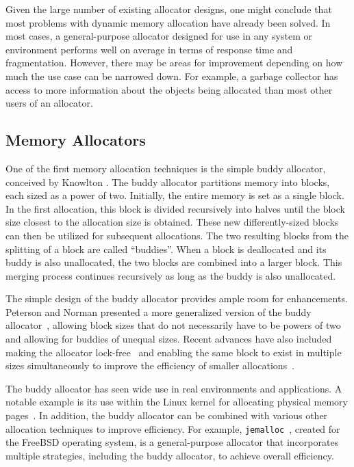 Given the large number of existing allocator designs, one might conclude that most problems with dynamic memory allocation have already been solved. In most cases, a general-purpose allocator designed for use in any system or environment performs well on average in terms of response time and fragmentation. However, there may be areas for improvement depending on how much the use case can be narrowed down. For example, a garbage collector has access to more information about the objects being allocated than most other users of an allocator.

\subsection{Memory Allocators}

One of the first memory allocation techniques is the simple buddy allocator, conceived by Knowlton \cite{buddy}. The buddy allocator partitions memory into blocks, each sized as a power of two. Initially, the entire memory is set as a single block. In the first allocation, this block is divided recursively into halves until the block size closest to the allocation size is obtained. These new differently-sized blocks can then be utilized for subsequent allocations. The two resulting blocks from the splitting of a block are called ``buddies''. When a block is deallocated and its buddy is also unallocated, the two blocks are combined into a larger block. This merging process continues recursively as long as the buddy is also unallocated.

The simple design of the buddy allocator provides ample room for enhancements. Peterson and Norman presented a more generalized version of the buddy allocator~\cite{genbuddy}, allowing block sizes that do not necessarily have to be powers of two and allowing for buddies of unequal sizes. Recent advances have also included making the allocator lock-free~\cite{nbbs} and enabling the same block to exist in multiple sizes simultaneously to improve the efficiency of smaller allocations~\cite{park2014ibuddy}.

The buddy allocator has seen wide use in real environments and applications. A notable example is its use within the Linux kernel for allocating physical memory pages~\cite{linuxbuddy}. In addition, the buddy allocator can be combined with various other allocation techniques to improve efficiency. For example, \texttt{jemalloc}~\cite{jemalloc}, created for the FreeBSD operating system, is a general-purpose allocator that incorporates multiple strategies, including the buddy allocator, to achieve overall efficiency.

